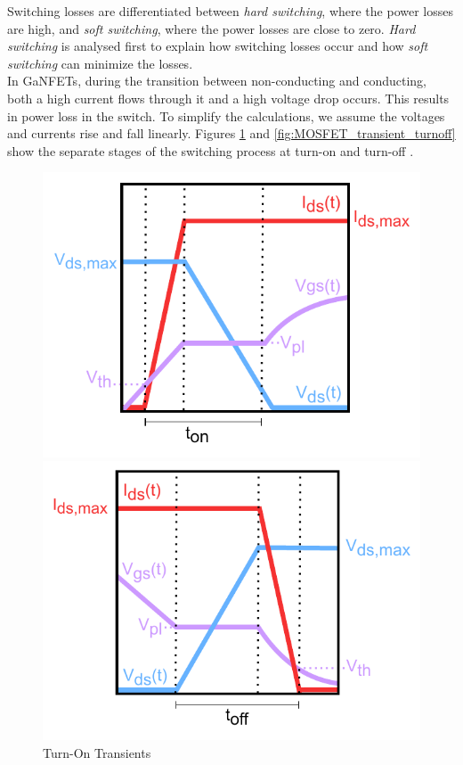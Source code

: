 Switching losses are differentiated between \textit{hard switching}, where the power losses are high, and \textit{soft switching}, where the power losses are close to zero. \textit{Hard switching} is analysed first to explain how switching losses occur and how \textit{soft switching} can minimize the losses.\\
In \acp{GaNFET}, during the transition between non-conducting and conducting, both a high current flows through it and a high voltage drop occurs. This results in power loss in the switch. To simplify the calculations, we assume the voltages and currents rise and fall linearly. Figures \ref{fig:MOSFET_transient_turnon} and \ref{fig:MOSFET_transient_turnoff} show the separate stages of the switching process at turn-on and turn-off \cite{en14113131}.
\begin{figure}[H]
    \centering
    \begin{minipage}{0.5\textwidth}
        \centering
        \includegraphics[width=1\linewidth]{Bilder/Kapitel2/Turn-On-Transients.pdf}
        \caption{Turn-On Transients}
        \label{fig:MOSFET_transient_turnon}
    \end{minipage}\hfill
    \begin{minipage}{0.5\textwidth}
        \centering
        \includegraphics[width=1\linewidth]{Bilder/Kapitel2/Turn-Off-Transients.pdf}

\end{minipage}
\end{figure}
